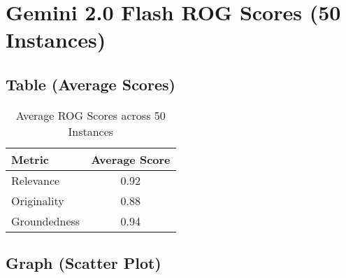 \documentclass{article}
\begin{document}
\section{Gemini 2.0 Flash ROG Scores (50 Instances)}

\subsection{Table (Average Scores)}


\begin{table}[h]
\centering
\begin{tabular}{lc}
\toprule
Metric & Average Score \\
\midrule
Relevance & 0.92 \\
Originality & 0.88 \\
Groundedness & 0.94 \\
\bottomrule
\end{tabular}
\caption{Average ROG Scores across 50 Instances}
\label{tab:avg_rog_score}
\end{table}
  

\subsection{Graph (Scatter Plot)}
\end{document}
